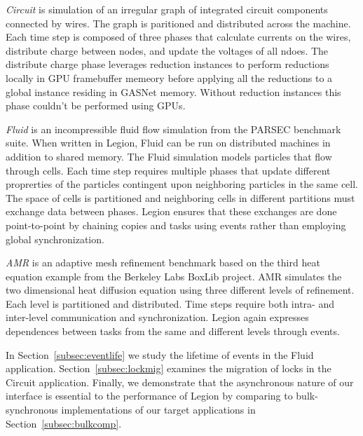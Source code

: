 {\em Circuit} is simulation of an irregular graph of integrated
circuit components connected by wires.  The graph is paritioned
and distributed across the machine.  Each time step is composed
of three phases that calculate currents on the wires, distribute charge between
nodes, and update the voltages of all ndoes.  The distribute charge
phase leverages reduction instances to perform reductions locally in GPU
framebuffer memeory before applying all the reductions to a global instance
residing in GASNet memory.  Without reduction instances this phase
couldn't be performed using GPUs.

{\em Fluid} is an incompressible fluid flow simulation from the PARSEC
benchmark suite\cite{bienia11benchmarking}.  When written in Legion, Fluid can
be run on distributed machines in addition to shared memory.  The Fluid simulation
models particles that flow through cells.  Each time step requires multiple phases
that update different proprerties of the particles contingent upon neighboring
particles in the same cell.  The space of cells is partitioned and neighboring
cells in different partitions must exchange data between phases.  Legion ensures
that these exchanges are done point-to-point by chaining copies and tasks
using events rather than employing global synchronization.

{\em AMR} is an adaptive mesh refinement benchmark based on the third heat
equation example from the Berkeley Labs BoxLib project\cite{BoxLib}.  AMR
simulates the two dimensional heat diffusion equation using three different levels
of refinement.  Each level is partitioned and distributed.  Time steps require
both intra- and inter-level communication and synchronization.  Legion again
expresses dependences between tasks from the same and different levels through
events.

In Section~\ref{subsec:eventlife} we study the lifetime of events in
the Fluid application.  Section~\ref{subsec:lockmig} examines
the migration of locks in the Circuit application.  Finally, we demonstrate
that the asynchronous nature of our interface is essential to the
performance of Legion by comparing to bulk-synchronous
implementations of our target applications in Section~\ref{subsec:bulkcomp}.
  
